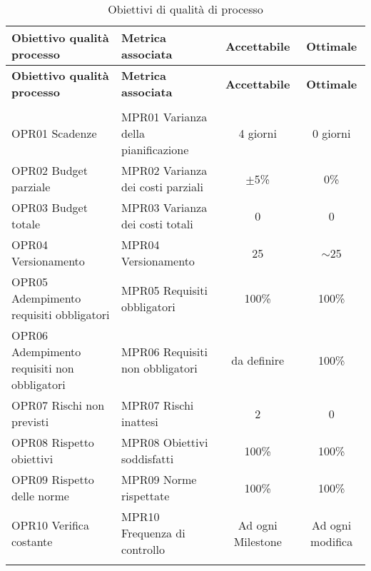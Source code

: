 \documentclass[../piano_di_qualifica.tex]{subfiles}
\begin{document}
\begin{center}
	\begin{longtable}{|p{4.5cm}|p{5cm}|c|c|}
		\hline
		\rowcolor{lightgray}
		{\textbf{Obiettivo qualità processo}} & {\textbf{Metrica associata}} & {\textbf{Accettabile}} & {\textbf{Ottimale}} \\
		\hline
		\endfirsthead

		\hline
		\rowcolor{lightgray}
		{\textbf{Obiettivo qualità processo}} & {\textbf{Metrica associata}} & {\textbf{Accettabile}} & {\textbf{Ottimale}} \\
		\hline
		\endhead

		\hline
		\rowcolor{white}
		\multicolumn{4}{|c|}{\emph{Continua alla pagina successiva...}}\\
		\hline
		\endfoot
		\endlastfoot

		OPR01 Scadenze                              & MPR01 Varianza della pianificazione 	& 4 giorni             	& 0 giorni             	\\
		OPR02 Budget parziale                       & MPR02 Varianza dei costi parziali   	& $\pm$5\%             	& 0\%                  	\\
		OPR03 Budget totale							& MPR03 Varianza dei costi totali	  	& 0						& 0						\\
		OPR04 Versionamento							& MPR04 Versionamento					& 25					& $\sim$25				\\
		OPR05 Adempimento requisiti obbligatori     & MPR05 Requisiti obbligatori         	& 100\%                	& 100\%                	\\
		OPR06 Adempimento requisiti non obbligatori & MPR06 Requisiti non obbligatori     	& da definire          	& 100\%                	\\
		OPR07 Rischi non previsti 					& MPR07 Rischi inattesi					& 2						& 0						\\
		OPR08 Rispetto obiettivi                    & MPR08 Obiettivi soddisfatti         	& 100\%                	& 100\%                	\\
		OPR09 Rispetto delle norme                  & MPR09 Norme rispettate              	& 100\%                	& 100\%                	\\
		OPR10 Verifica costante                     & MPR10 Frequenza di controllo        	& Ad ogni Milestone    	& Ad ogni modifica     	\\
		\hline
		\rowcolor{white}
		\caption{Obiettivi di qualità di processo}
	\end{longtable}
\end{center}
\end{document}
